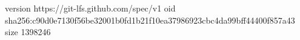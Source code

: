 version https://git-lfs.github.com/spec/v1
oid sha256:c90d0e7130f56be32001b0fd1b21f10ea37986923cbc4da99bff44400f857a43
size 1398246

